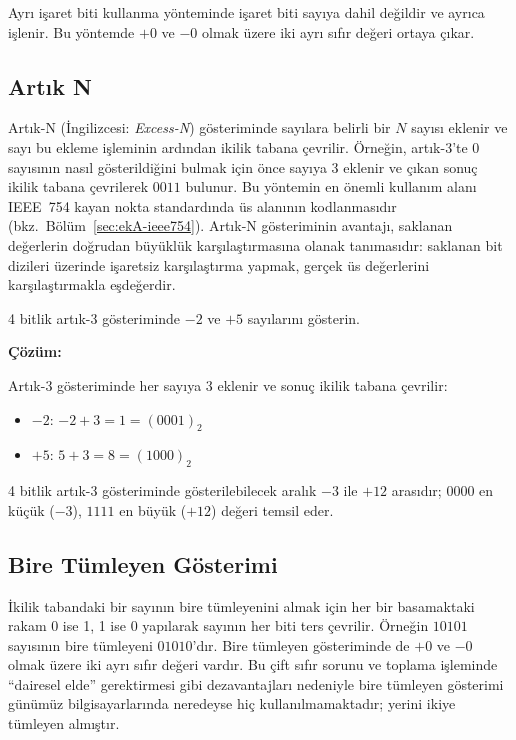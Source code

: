 Ayrı işaret biti kullanma yönteminde işaret biti sayıya dahil değildir ve ayrıca işlenir. Bu yöntemde $+0$ ve $-0$ olmak üzere iki ayrı sıfır değeri ortaya çıkar.

\subsection{Artık N}

Artık-N (İngilizcesi: \textit{Excess-N}) gösteriminde sayılara belirli bir $N$ sayısı eklenir ve sayı bu ekleme işleminin ardından ikilik tabana çevrilir. Örneğin, artık-3'te 0 sayısının nasıl gösterildiğini bulmak için önce sayıya 3 eklenir ve çıkan sonuç ikilik tabana çevrilerek $0011$ bulunur. Bu yöntemin en önemli kullanım alanı IEEE~754 kayan nokta standardında üs alanının kodlanmasıdır (bkz.\ Bölüm~\ref{sec:ekA-ieee754}). Artık-N gösteriminin avantajı, saklanan değerlerin doğrudan büyüklük karşılaştırmasına olanak tanımasıdır: saklanan bit dizileri üzerinde işaretsiz karşılaştırma yapmak, gerçek üs değerlerini karşılaştırmakla eşdeğerdir.

\begin{ornek}[A.10]
4 bitlik artık-3 gösteriminde $-2$ ve $+5$ sayılarını gösterin.

\textbf{Çözüm:}

Artık-3 gösteriminde her sayıya 3 eklenir ve sonuç ikilik tabana çevrilir:
\begin{itemize}[nosep]
    \item $-2$: \;$-2 + 3 = 1 = (0001)_2$
    \item $+5$: \;$5 + 3 = 8 = (1000)_2$
\end{itemize}
4 bitlik artık-3 gösteriminde gösterilebilecek aralık $-3$ ile $+12$ arasıdır; $0000$ en küçük ($-3$), $1111$ en büyük ($+12$) değeri temsil eder.
\end{ornek}

\subsection{Bire Tümleyen Gösterimi}

İkilik tabandaki bir sayının bire tümleyenini almak için her bir basamaktaki rakam 0 ise 1, 1 ise 0 yapılarak sayının her biti ters çevrilir. Örneğin $10101$ sayısının bire tümleyeni $01010$'dır. Bire tümleyen gösteriminde de $+0$ ve $-0$ olmak üzere iki ayrı sıfır değeri vardır. Bu çift sıfır sorunu ve toplama işleminde ``dairesel elde'' gerektirmesi gibi dezavantajları nedeniyle bire tümleyen gösterimi günümüz bilgisayarlarında neredeyse hiç kullanılmamaktadır; yerini ikiye tümleyen almıştır.

